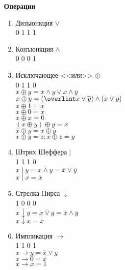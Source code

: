     \begin{minipage}[t]{0.4 \textwidth}
        \centering
        \textbf{Операции}
        \begin{enumerate}
            \item Дизъюнкция $\vee$\\0 1 1 1

            \item Конъюнкция $\wedge$\\0 0 0 1

            \item Исключающее <<или>> $\oplus$\\ 0 1 1 0\\
            $x \oplus y = \overline x \wedge y \vee x \wedge \overline y$\\
            $x \oplus y = (\overlint x \vee \overline y) \wedge (x \vee y)$\\
            $x \oplus 1 = \overline x$\\
            $x \oplus 0 = x$\\
            $x \oplus x = 0$\\
            $(x \oplus y) \oplus y = x$\\
            $\overline x \oplus y = x \oplus \overline y$\\
            $x \oplus y = z; x \oplus z = y$

            \item Штрих Шеффера $|$\\ 1 1 1 0\\
            $x \mid y = \overline{x \wedge y} = \overline x \vee \overline y$\\
            $x \mid x = \overline x$\\

            \item Стрелка Пирса $\downarrow$\\ 1 0 0 0\\
            $x \downarrow y = \overline{x \vee y} = \overline x \wedge \overline y$\\
            $x \downarrow x = \overline x$

            \item Импликация $\rightarrow$\\ 1 1 0 1\\
            $x \rightarrow y = \overline x \vee y$\\
            $x \rightarrow 0 = \overline x$\\
            $x \rightarrow x = 1$\\


\end{enumerate}
\end{minipage}
